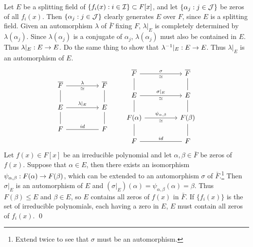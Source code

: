\pf \note{\mimp} Let \(E\) be a splitting field of \(\{f_i(x) : i \in \mathcal{I}\} \subset F[x]\), and let \(\{\alpha_j : j \in \mathcal{J}\}\) be zeros of all \(f_i(x)\). Then \(\{\alpha_j : j \in \mathcal{J}\}\) clearly generates \(E\) over \(F\), since \(E\) is a splitting field. Given an automorphism \(\lambda\) of \(\bar{F}\) fixing \(F\), \(\lambda |_E\) is completely determined by \(\lambda(\alpha_j)\). Since \(\lambda(\alpha_j)\) is a conjugate of \(\alpha_j\), \(\lambda(\alpha_j)\) must also be contained in \(E\). Thus \(\lambda |_E : E \rightarrow E\). Do the same thing to show that \(\lambda^{-1}|_E : E \rightarrow E\). Thus \(\lambda|_E\) is an automorphism of \(E\).
\[
    \vspace*{-5px}
    \begin{tikzcd}
        \bar{F} \arrow[dash]{d} \arrow{rr}{\lambda}[swap]{\simeq} && \bar{F} \arrow[dash]{d} \\
        E \arrow[dash]{d} \arrow{rr}{\lambda|_E} && E \arrow[dash]{d} \\
        F \arrow[dash]{rr}{id} && F
    \end{tikzcd}
    \qquad
    \begin{tikzcd}
        \bar{F} \arrow[dash]{d} \arrow{rr}{\sigma}[swap]{\simeq} && \bar{F} \arrow[dash]{d} \\
        E \arrow[dash]{d} \arrow{rr}{\sigma|_E}[swap]{\simeq} && E \arrow[dash]{d} \\
        F(\alpha) \arrow[dash]{d} \arrow{rr}{\psi_{\alpha, \beta}}[swap]{\simeq} && F(\beta) \arrow[dash]{d} \\
        F \arrow[dash]{rr}{id} && F
    \end{tikzcd}
\]
\note{\mimpd} Let \(f(x) \in F[x]\) be an irreducible polynomial and let \(\alpha, \beta \in \bar{F}\) be zeros of \(f(x)\). Suppose that \(\alpha \in E\), then there exists an isomorphism \(\psi_{\alpha, \beta} : F(\alpha) \rightarrow F(\beta)\), which can be extended to an automorphism \(\sigma\) of \(\bar{F}\).\footnote{Extend twice to see that \(\sigma\) must be an automorphism.} Then \(\sigma|_E\) is an automorphism of \(E\) and \((\sigma|_E)(\alpha) = \psi_{\alpha, \beta}(\alpha) = \beta\). Thus \(F(\beta) \leq E\) and \(\beta \in E\), so \(E\) contains all zeros of \(f(x)\) in \(\bar{F}\). If \(\{f_i(x)\}\) is the set of irreducible polynomials, each having a zero in \(E\), \(E\) must contain all zeros of \(f_i(x)\). \qed

\pagebreak
